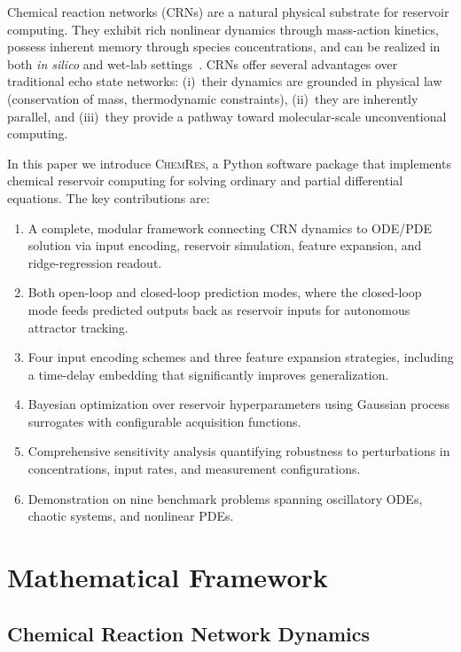 \documentclass[11pt,twocolumn]{article}
\newcommand{\software}{\textsc{ChemRes}}
\begin{document}
Chemical reaction networks (CRNs) are a natural physical substrate for
reservoir computing.  They exhibit rich nonlinear dynamics through mass-action
kinetics, possess inherent memory through species concentrations, and can be
realized in both \emph{in silico} and wet-lab settings~\cite{
goudarzi2013dna, yahiro2018reservoir}.  CRNs offer several advantages over
traditional echo state networks: (i)~their dynamics are grounded in physical
law (conservation of mass, thermodynamic constraints), (ii)~they are
inherently parallel, and (iii)~they provide a pathway toward molecular-scale
unconventional computing.

In this paper we introduce \software{}, a Python software package that
implements chemical reservoir computing for solving ordinary and partial
differential equations.  The key contributions are:

\begin{enumerate}
  \item A complete, modular framework connecting CRN dynamics to
    ODE/PDE solution via input encoding, reservoir simulation, feature
    expansion, and ridge-regression readout.
  \item Both open-loop and closed-loop prediction modes, where the
    closed-loop mode feeds predicted outputs back as reservoir inputs
    for autonomous attractor tracking.
  \item Four input encoding schemes and three feature expansion strategies,
    including a time-delay embedding that significantly improves
    generalization.
  \item Bayesian optimization over reservoir hyperparameters using
    Gaussian process surrogates with configurable acquisition functions.
  \item Comprehensive sensitivity analysis quantifying robustness to
    perturbations in concentrations, input rates, and measurement
    configurations.
  \item Demonstration on nine benchmark problems spanning oscillatory ODEs,
    chaotic systems, and nonlinear PDEs.
\end{enumerate}

\section{Mathematical Framework}
\label{sec:methods}

\subsection{Chemical Reaction Network Dynamics}
\label{sec:crn}
\end{document}
